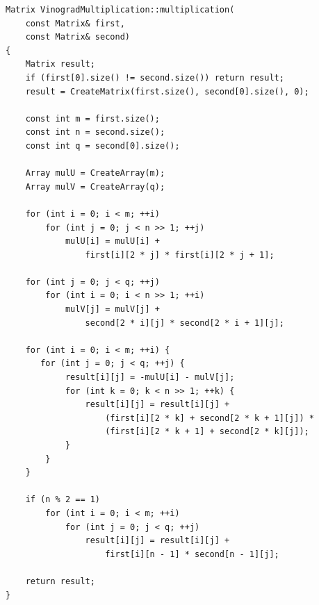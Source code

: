 \documentclass[a4paper,12pt]{article}
\begin{document}
\begin{lstlisting}[caption=Алгоритм Винограда умножения матриц,label=list:vin]
Matrix VinogradMultiplication::multiplication(
    const Matrix& first,
    const Matrix& second)
{
    Matrix result;
    if (first[0].size() != second.size()) return result;
    result = CreateMatrix(first.size(), second[0].size(), 0);

    const int m = first.size();
    const int n = second.size();
    const int q = second[0].size();

    Array mulU = CreateArray(m);
    Array mulV = CreateArray(q);

    for (int i = 0; i < m; ++i)
        for (int j = 0; j < n >> 1; ++j)
            mulU[i] = mulU[i] +
                first[i][2 * j] * first[i][2 * j + 1];

    for (int j = 0; j < q; ++j)
        for (int i = 0; i < n >> 1; ++i)
            mulV[j] = mulV[j] +
                second[2 * i][j] * second[2 * i + 1][j];

    for (int i = 0; i < m; ++i) {
       for (int j = 0; j < q; ++j) {
            result[i][j] = -mulU[i] - mulV[j];
            for (int k = 0; k < n >> 1; ++k) {
                result[i][j] = result[i][j] +
                    (first[i][2 * k] + second[2 * k + 1][j]) *
                    (first[i][2 * k + 1] + second[2 * k][j]);
            }
        }
    }

    if (n % 2 == 1)
        for (int i = 0; i < m; ++i)
            for (int j = 0; j < q; ++j)
                result[i][j] = result[i][j] +
                    first[i][n - 1] * second[n - 1][j];

    return result;
}
\end{lstlisting}
\end{document}
